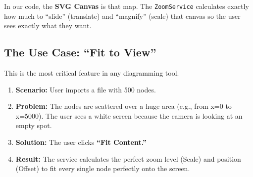 \documentclass[a4paper,11pt,oneside]{report}
\begin{document}
In our code, the \textbf{SVG Canvas} is that map. The \texttt{ZoomService} calculates exactly how much to ``slide'' (translate) and ``magnify'' (scale) that canvas so the user sees exactly what they want.

\subsection{The Use Case: ``Fit to View''}

This is the most critical feature in any diagramming tool.
\begin{enumerate}
    \item \textbf{Scenario:} User imports a file with 500 nodes.
    \item \textbf{Problem:} The nodes are scattered over a huge area (e.g., from x=0 to x=5000). The user sees a white screen because the camera is looking at an empty spot.
    \item \textbf{Solution:} The user clicks \textbf{``Fit Content.''}
    \item \textbf{Result:} The service calculates the perfect zoom level (Scale) and position (Offset) to fit every single node perfectly onto the screen.
\end{enumerate}
\end{document}
